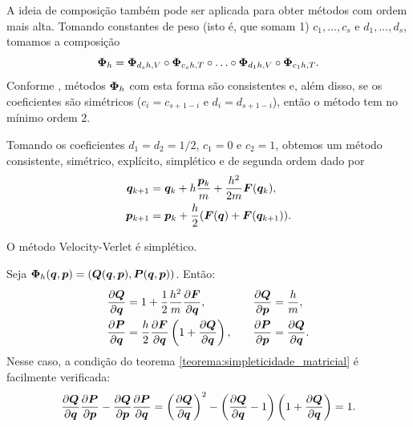 A ideia de composição também pode ser aplicada para obter métodos com ordem mais alta. Tomando constantes de peso (isto é, que somam 1) $c_1, ..., c_s$ e $d_1, ..., d_s$, tomamos a composição
\begin{equation*}
    \bm \Phi_h = \bm \Phi_{d_s h, V} \circ \bm \Phi_{c_s h, T} \circ \hdots \circ \bm \Phi_{d_1 h, V} \circ \bm \Phi_{c_1 h, T}.
\end{equation*}
Conforme \cite[145-146]{Leimkuhler2005}, métodos $\bm \Phi_h$ com esta forma são consistentes e, além disso, se os coeficientes são simétricos ($c_i = c_{s+1-i}$ e $d_i = d_{s+1-i}$), então o método tem no mínimo ordem 2.

\begin{method}\label{metodo:velocity-verlet}
    Tomando os coeficientes $d_1=d_2=1/2$, $c_1 = 0$ e $c_2=1$, obtemos um método consistente, simétrico, explícito, simplético e de segunda ordem dado por
    \begin{align*}
        \bm q_{k+1} &= \bm q_k + h \dfrac{\bm p_k}{m} + \dfrac{h^2}{2 m} \bm F(\bm q_k), 
        \\
        \bm p_{k+1} &= \bm p_k + \dfrac{h}{2} (\bm F(\bm q) + \bm F(\bm q_{k+1})).
    \end{align*}
\end{method}

\begin{theorem}
    O método Velocity-Verlet é simplético.
\end{theorem}
\begin{Proof}
    Seja $\bm \Phi_h (\bm q, \bm p) = (\bm Q (\bm q, \bm p), \bm P(\bm q, \bm p))$. Então:
    \begin{align*}
        \dfrac{\partial \bm Q}{\partial \bm q} &= 1 + \dfrac{1}{2} \dfrac{h^2}{m} \dfrac{\partial \bm F}{\partial \bm q}, 
        &\quad
        \dfrac{\partial \bm Q}{\partial \bm p} &= \dfrac{h}{m}, 
        \\
        \dfrac{\partial \bm P}{\partial \bm q} &= \dfrac{h}{2} \dfrac{\partial \bm F}{\partial \bm q} \left(1 + \dfrac{\partial \bm Q}{\partial \bm q}\right),
        &\quad
        \dfrac{\partial \bm P}{\partial \bm p} &= \dfrac{\partial \bm Q}{\partial \bm q}.
    \end{align*}
    Nesse caso, a condição do teorema \ref{teorema:simpleticidade_matricial} é facilmente verificada:
    \begin{equation*}
        \dfrac{\partial \bm Q}{\partial \bm q} \dfrac{\partial \bm P}{\partial \bm p} - \dfrac{\partial \bm Q}{\partial \bm p} \dfrac{\partial \bm P}{\partial \bm q} 
        = \left(\dfrac{\partial \bm Q}{\partial \bm q}\right)^2 - \left(\dfrac{\partial \bm Q}{\partial \bm q} - 1\right) \left(1 + \dfrac{\partial \bm Q}{\partial \bm q}\right) = 1.
    \end{equation*}
\end{Proof}

